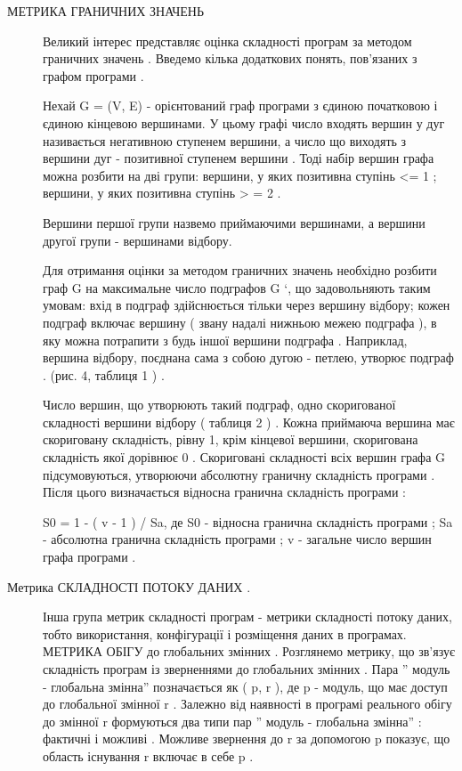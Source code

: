 \begin{description}
\item[{МЕТРИКА ГРАНИЧНИХ ЗНАЧЕНЬ}] \leavevmode
Великий інтерес представляє оцінка складності програм за методом граничних значень .
Введемо кілька додаткових понять, пов'язаних з графом програми .

Нехай G = (V, E) - орієнтований граф програми з єдиною початковою і єдиною кінцевою вершинами. У цьому графі число входять вершин у дуг називається негативною ступенем вершини, а число що виходять з вершини дуг - позитивної ступенем вершини . Тоді набір вершин графа можна розбити на дві групи: вершини, у яких позитивна ступінь \textless{}= 1 ; вершини, у яких позитивна ступінь \textgreater{} = 2 .

Вершини першої групи назвемо приймаючими вершинами, а вершини другої групи - вершинами відбору.

Для отримання оцінки за методом граничних значень необхідно розбити граф G на максимальне число подграфов G `, що задовольняють таким умовам: вхід в подграф здійснюється тільки через вершину відбору; кожен подграф включає вершину ( звану надалі нижньою межею подграфа ), в яку можна потрапити з будь іншої вершини подграфа . Наприклад, вершина відбору, поєднана сама з собою дугою - петлею, утворює подграф . (рис. 4, таблиця 1 ) .

Число вершин, що утворюють такий подграф, одно скоригованої складності вершини відбору ( таблиця 2 ) . Кожна приймаюча вершина має скориговану складність, рівну 1, крім кінцевої вершини, скоригована складність якої дорівнює 0 . Скориговані складності всіх вершин графа G підсумовуються, утворюючи абсолютну граничну складність програми . Після цього визначається відносна гранична складність програми :

S0 = 1 - ( v - 1 ) / Sa,
де S0 - відносна гранична складність програми ; Sa - абсолютна гранична складність програми ; v - загальне число вершин графа програми .

\item[{Метрика СКЛАДНОСТІ ПОТОКУ ДАНИХ .}] \leavevmode
Інша група метрик складності програм - метрики складності потоку даних, тобто використання, конфігурації і розміщення даних в програмах.
МЕТРИКА ОБІГУ до глобальних змінних .
Розглянемо метрику, що зв'язує складність програм із зверненнями до глобальних змінних .
Пара '' модуль - глобальна змінна'' позначається як ( p, r ), де p - модуль, що має доступ до глобальної змінної r . Залежно від наявності в програмі реального обігу до змінної r формуються два типи пар '' модуль - глобальна змінна'' : фактичні і можливі . Можливе звернення до r за допомогою p показує, що область існування r включає в себе p .


\end{description}
